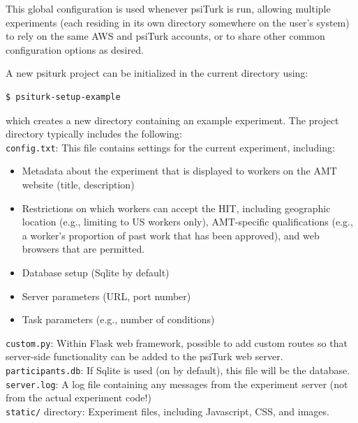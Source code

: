 \documentclass[twocolumn]{svjour3}          %
\begin{document}
This global configuration is used whenever psiTurk is run, allowing multiple experiments (each residing in its own directory somewhere on the user's system) to rely on the same AWS and psiTurk accounts, or to share other common configuration options as desired.

A new psiturk project can be initialized in the current directory using:

\begin{lstlisting}
$ psiturk-setup-example
\end{lstlisting}

\noindent which creates a new directory containing an example experiment.
The project directory typically includes the following: \\


\noindent \texttt{config.txt}: This file contains settings for the current experiment, including:

\begin{itemize}
\item Metadata about the experiment that is displayed to workers on the AMT website (title, description)
\item Restrictions on which workers can accept the HIT, including geographic location (e.g., limiting to US workers only), AMT-specific qualifications (e.g., a worker's proportion of past work that has been approved), and web browsers that are permitted.
\item Database setup (Sqlite by default)
\item Server parameters (URL, port number)
\item Task parameters (e.g., number of conditions)
\end{itemize}


\noindent \texttt{custom.py}: Within Flask web framework, possible to add custom routes so that server-side functionality can be added to the psiTurk web server. \\ 

\noindent \texttt{participants.db}: If Sqlite is used (on by default), this file will be the database. \\

\noindent \texttt{server.log}: A log file containing any messages from the experiment server (not from the actual experiment code!) \\ 

\noindent \texttt{static/} directory: Experiment files, including Javascript, CSS, and images. \\
\end{document}
